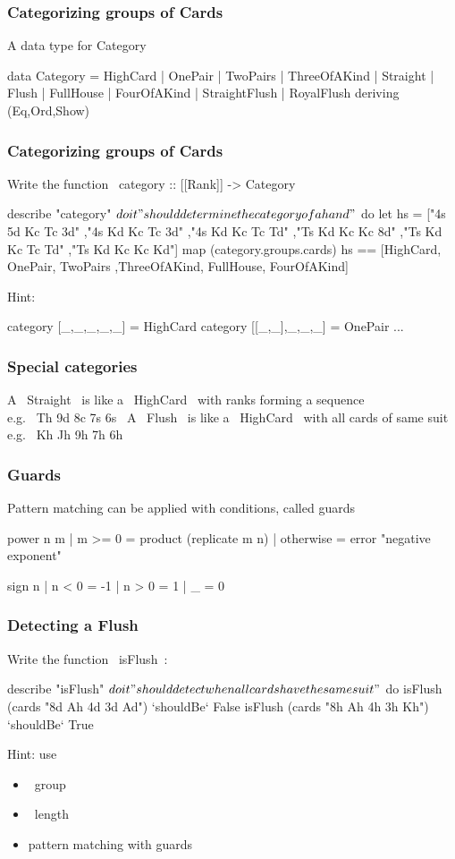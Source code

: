 \documentclass[11pt,xcolor={dvipsnames}]{beamer}
\newcommand{\vs}{\vspace{1em}}
\begin{document}
\begin{frame}[fragile]
\frametitle{Categorizing groups of Cards}
A data type for Category
\begin{haskell}
data Category = HighCard | OnePair | TwoPairs | ThreeOfAKind 
              | Straight | Flush | FullHouse | FourOfAKind 
              | StraightFlush | RoyalFlush
    deriving (Eq,Ord,Show)
\end{haskell}
\end{frame}
\begin{frame}[fragile]
\frametitle{Categorizing groups of Cards}
Write the function
 ~category :: [[Rank]] -> Category~
\begin{hspec}
describe "category" $ do
    it "should determine the category of a hand" $ do
        let hs = ["4s 5d Kc Tc 3d"
                 ,"4s Kd Kc Tc 3d"
                 ,"4s Kd Kc Tc Td"
                 ,"Ts Kd Kc Kc 8d"
                 ,"Ts Kd Kc Tc Td"
                 ,"Ts Kd Kc Kc Kd"]
        map (category.groups.cards) hs ==  
                [HighCard, OnePair, TwoPairs
                ,ThreeOfAKind, FullHouse, FourOfAKind]
\end{hspec}
Hint:
\begin{haskell}
category [_,_,_,_,_]   = HighCard
category [[_,_],_,_,_] = OnePair
...
\end{haskell}
\end{frame}
\begin{frame}[fragile]
\frametitle{Special categories}
A ~Straight~ is like a ~HighCard~ with ranks forming a sequence\\
\vs
e.g. ~Th 9d 8c 7s 6s~
\vs
A ~Flush~ is like a ~HighCard~ with all cards of same suit
\vs
e.g. ~Kh Jh 9h 7h 6h~
\end{frame}
\begin{frame}[fragile]
\frametitle{Guards}
Pattern matching can be applied with conditions, called guards
\begin{haskell}
power n m | m >= 0    = product (replicate m n)
          | otherwise = error "negative exponent"   

sign n | n < 0 = -1
       | n > 0 =  1
       | _     =  0
\end{haskell}
\end{frame}
\begin{frame}[fragile]
\frametitle{Detecting a Flush}
Write the function ~isFlush~:
\begin{hspec}
describe "isFlush" $ do
    it "should detect when all cards have the same suit" $ do
        isFlush (cards "8d Ah 4d 3d Ad") `shouldBe` False
        isFlush (cards "8h Ah 4h 3h Kh") `shouldBe` True
\end{hspec}
Hint: use
\begin{itemize}
\item  ~group~
\item  ~length~
\item  pattern matching with guards
\end{itemize}
\end{frame}
\end{document}
